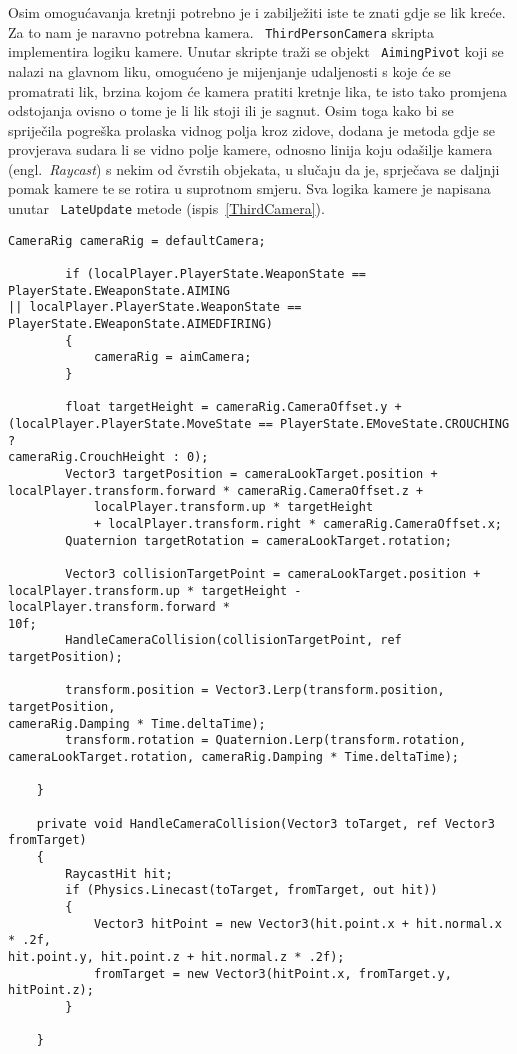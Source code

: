 Osim omogućavanja kretnji potrebno je i zabilježiti iste te znati gdje se lik kreće.
Za to nam je naravno potrebna kamera. ~\texttt{ThirdPersonCamera} skripta implementira logiku
kamere. Unutar skripte traži se objekt ~\texttt{AimingPivot} koji se nalazi na glavnom liku,
omogućeno je mijenjanje udaljenosti s koje će se promatrati lik, brzina kojom će
kamera pratiti kretnje lika, te isto tako promjena odstojanja ovisno o tome je li
lik stoji ili je sagnut. Osim toga kako bi se spriječila pogreška prolaska vidnog
polja kroz zidove, dodana je metoda gdje se provjerava sudara li se vidno polje
kamere, odnosno linija koju odašilje kamera (engl.~\textit{Raycast}) s nekim od
čvrstih objekata, u slučaju da je, sprječava se daljnji pomak kamere te se rotira u
suprotnom smjeru. Sva logika kamere je napisana unutar ~\texttt{LateUpdate} metode
(ispis~\ref{ThirdCamera}).
\begin{lstlisting}[caption={Logika kamere}, label=ThirdCamera]
    CameraRig cameraRig = defaultCamera;

        if (localPlayer.PlayerState.WeaponState == PlayerState.EWeaponState.AIMING
|| localPlayer.PlayerState.WeaponState ==
PlayerState.EWeaponState.AIMEDFIRING)
        {
            cameraRig = aimCamera;
        }

        float targetHeight = cameraRig.CameraOffset.y +
(localPlayer.PlayerState.MoveState == PlayerState.EMoveState.CROUCHING ?
cameraRig.CrouchHeight : 0);
        Vector3 targetPosition = cameraLookTarget.position +
localPlayer.transform.forward * cameraRig.CameraOffset.z +
            localPlayer.transform.up * targetHeight
            + localPlayer.transform.right * cameraRig.CameraOffset.x;
        Quaternion targetRotation = cameraLookTarget.rotation;

        Vector3 collisionTargetPoint = cameraLookTarget.position +
localPlayer.transform.up * targetHeight - localPlayer.transform.forward *
10f;
        HandleCameraCollision(collisionTargetPoint, ref targetPosition);

        transform.position = Vector3.Lerp(transform.position, targetPosition,
cameraRig.Damping * Time.deltaTime);
        transform.rotation = Quaternion.Lerp(transform.rotation,
cameraLookTarget.rotation, cameraRig.Damping * Time.deltaTime);

    }

    private void HandleCameraCollision(Vector3 toTarget, ref Vector3 fromTarget)
    {
        RaycastHit hit;
        if (Physics.Linecast(toTarget, fromTarget, out hit))
        {
            Vector3 hitPoint = new Vector3(hit.point.x + hit.normal.x * .2f,
hit.point.y, hit.point.z + hit.normal.z * .2f);
            fromTarget = new Vector3(hitPoint.x, fromTarget.y, hitPoint.z);
        }

    }
\end{lstlisting}

